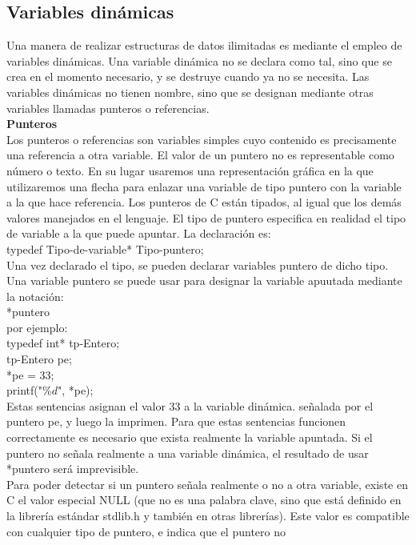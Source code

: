 \documentclass[11pt,a4paper]{article}
\begin{document}
  	\subsection{Variables dinámicas}
  	Una manera de realizar estructuras de datos ilimitadas es mediante el empleo de variables dinámicas. Una variable dinámica no se declara como tal, sino que se crea en el momento necesario, y se destruye cuando ya no se necesita. Las variables dinámicas no tienen nombre, sino que se designan
  	mediante otras variables llamadas punteros o referencias.\\
  	\textbf{Punteros}\\
  	Los punteros o referencias son variables simples cuyo contenido es precisamente una referencia a otra variable. El valor de un puntero no es representable como número o texto. En su lugar usaremos una representación gráfica en la que utilizaremos una flecha para enlazar una variable de tipo puntero
  	con la variable a la que hace referencia. Los punteros de C están tipados, al igual que los demás valores manejados en el lenguaje. El tipo de puntero especifica en realidad el tipo de variable a la que puede apuntar. La declaración es:\\
  	typedef Tipo-de-variable* Tipo-puntero;\\
  	Una vez declarado el tipo, se pueden declarar variables puntero de dicho tipo.
  	Una variable puntero se puede usar para designar la variable apuutada
  	mediante la notación:\\
  	*puntero\\
  	por ejemplo: \\
  	typedef int* tp-Entero;\\
  	tp-Entero pe;\\
  	*pe = 33;\\
  	printf("$\%d$", *pe);\\
  	Estas sentencias asignan el valor 33 a la variable dinámica. señalada por el puntero pe, y luego la imprimen. Para que estas sentencias funcionen correctamente es necesario que exista realmente la variable apuntada. Si el puntero
  	no señala realmente a una variable dinámica, el resultado de usar *puntero será imprevisible.\\
  	Para poder detectar si un puntero señala realmente o no a otra variable, existe
  	en C el valor especial NULL (que no es una palabra clave, sino que está
  	definido en la librería estándar stdlib.h y también en otras librerías). Este
  	valor es compatible con cualquier tipo de puntero, e indica que el puntero no
\end{document}
